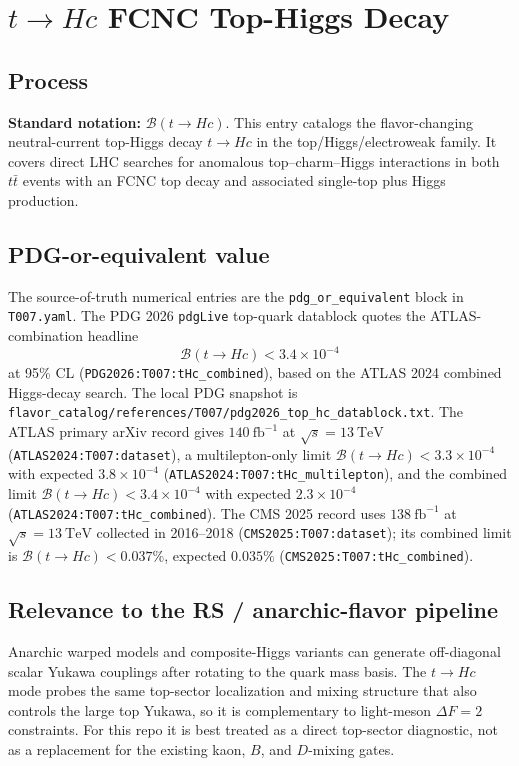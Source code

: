 
\section{\texorpdfstring{\(t\to Hc\)}{t -> H c} FCNC Top-Higgs Decay}

\subsection*{Process}
\textbf{Standard notation:} \(\mathcal{B}(t\to Hc)\).
This entry catalogs the flavor-changing neutral-current top-Higgs decay
\(t\to Hc\) in the top/Higgs/electroweak family.  It covers direct LHC
searches for anomalous top--charm--Higgs interactions in both \(t\bar t\)
events with an FCNC top decay and associated single-top plus Higgs production.

\subsection*{PDG-or-equivalent value}
The source-of-truth numerical entries are the \texttt{pdg\_or\_equivalent}
block in \texttt{T007.yaml}.  The PDG 2026 \texttt{pdgLive} top-quark
datablock quotes the ATLAS-combination headline
\[
  \mathcal{B}(t\to Hc) < 3.4\times 10^{-4}
\]
at 95\% CL (\texttt{PDG2026:T007:tHc\_combined}), based on the ATLAS 2024
combined Higgs-decay search.  The local PDG snapshot is
\texttt{flavor\_catalog/references/T007/pdg2026\_top\_hc\_datablock.txt}.
The ATLAS primary arXiv record gives \(140~\mathrm{fb}^{-1}\) at
\(\sqrt{s}=13~\mathrm{TeV}\) (\texttt{ATLAS2024:T007:dataset}), a
multilepton-only limit \(\mathcal{B}(t\to Hc)<3.3\times10^{-4}\)
with expected \(3.8\times10^{-4}\)
(\texttt{ATLAS2024:T007:tHc\_multilepton}), and the combined limit
\(\mathcal{B}(t\to Hc)<3.4\times10^{-4}\) with expected
\(2.3\times10^{-4}\) (\texttt{ATLAS2024:T007:tHc\_combined}).  The CMS 2025
record uses \(138~\mathrm{fb}^{-1}\) at \(\sqrt{s}=13~\mathrm{TeV}\) collected
in 2016--2018 (\texttt{CMS2025:T007:dataset}); its combined limit is
\(\mathcal{B}(t\to Hc)<0.037\%\), expected \(0.035\%\)
(\texttt{CMS2025:T007:tHc\_combined}).

\subsection*{Relevance to the RS / anarchic-flavor pipeline}
Anarchic warped models and composite-Higgs variants can generate off-diagonal
scalar Yukawa couplings after rotating to the quark mass basis.  The \(t\to Hc\)
mode probes the same top-sector localization and mixing structure that also
controls the large top Yukawa, so it is complementary to light-meson
\(\Delta F=2\) constraints.  For this repo it is best treated as a direct
top-sector diagnostic, not as a replacement for the existing kaon, \(B\), and
\(D\)-mixing gates.

